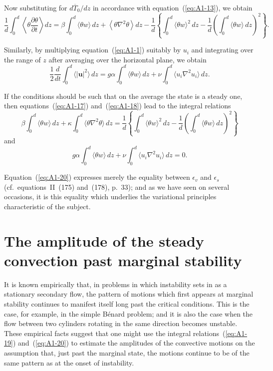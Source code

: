 Now substituting for $d\overline{T}_0/dz$ in accordance with equation~(\ref{eq:A1-13}), we obtain
\begin{equation}
\label{eq:A1-17}
\frac{1}{d} \int_0^d \left\langle \theta \frac{\partial \theta}{\partial t} \right\rangle dz = \beta \int_0^d \langle \theta w \rangle \, dz + \left\langle \theta \nabla^2 \theta \right\rangle dz -
\frac{1}{d} \left\{ \int_0^d \langle \theta w \rangle^2 \, dz - \frac{1}{d} \left( \int_0^d \langle \theta w \rangle \, dz \right)^{\!2} \right\}.
\end{equation}

Similarly, by multiplying equation~(\ref{eq:A1-1}) suitably by $u_i$ and integrating over the range of $z$ after averaging over the horizontal plane, we obtain
\begin{equation}
\label{eq:A1-18}
\frac{1}{2} \frac{d}{dt} \int_0^d \langle |\mathbf{u}|^2 \rangle \, dz = g\alpha \int_0^d \langle \theta w \rangle \, dz + \nu \int_0^d \langle u_i \nabla^2 u_i \rangle \, dz.
\end{equation}

If the conditions should be such that on the average the state is a steady one, then equations~(\ref{eq:A1-17}) and~(\ref{eq:A1-18}) lead to the integral relations
\begin{equation}
\label{eq:A1-19}
\beta \int_0^d \langle \theta w \rangle \, dz + \kappa \int_0^d \langle \theta \nabla^2 \theta \rangle \, dz = \frac{1}{d} \left\{ \int_0^d \langle \theta w \rangle^2 \, dz - \frac{1}{d} \left( \int_0^d \langle \theta w \rangle \, dz \right)^{\!2} \right\}
\end{equation}
and
\begin{equation}
\label{eq:A1-20}
g\alpha \int_0^d \langle \theta w \rangle \, dz + \nu \int_0^d \langle u_i \nabla^2 u_i \rangle \, dz = 0.
\end{equation}

Equation~(\ref{eq:A1-20}) expresses merely the equality between $\epsilon_v$ and $\epsilon_s$ (cf.\ equations~II~(175) and~(178), p.~33); and as we have seen on several occasions, it is this equality which underlies the variational principles characteristic of the subject.

\section{The amplitude of the steady convection past marginal stability}\label{sec:126}

It is known empirically that, in problems in which instability sets in as a stationary secondary flow, the pattern of motions which first appears at marginal stability continues to manifest itself long past the critical conditions. This is the case, for example, in the simple B\'enard problem; and it is also the case when the flow between two cylinders rotating in the same direction becomes unstable. These empirical facts suggest that one might use the integral relations~(\ref{eq:A1-19}) and~(\ref{eq:A1-20}) to estimate the amplitudes of the convective motions on the assumption that, just past the marginal state, the motions continue to be of the same pattern as at the onset of instability.

